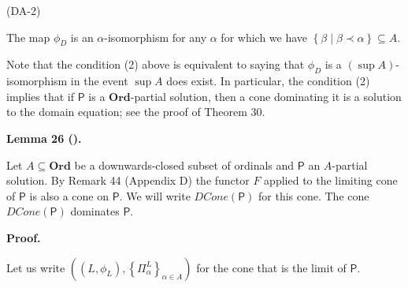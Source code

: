  
 
\par\noindent  (DA-2) 
 
The map $\phi_{D}$ is an $\alpha$-isomorphism for any $\alpha$ for which we have $\left\{\beta\middle|\beta\prec\alpha\right\}\subseteq A$.\par
 
 
  
 
 
 
Note that the condition (2) above is equivalent to saying that $\phi_{D}$ is a $(\sup{}A)$-isomorphism in the event $\sup{}A$ does exist. In particular, the condition (2) implies that if $\boldsymbol{\mathsf{P}}$ is a $\mathbf{Ord}$-partial solution, then a cone dominating it is a solution to the domain equation; see the proof of Theorem 30.\par
 
 
 
\par\medskip\noindent\textbf{Lemma 26 ().}\par
 
 
Let $A\subseteq\mathbf{Ord}$ be a downwards-closed subset of ordinals and $\boldsymbol{\mathsf{P}}$ an $A$-partial solution. By Remark 44 (Appendix D) the functor $F$ applied to the limiting cone of $\boldsymbol{\mathsf{P}}$ is also a cone on $\boldsymbol{\mathsf{P}}$. We will write $\mathit{DCone}(\boldsymbol{\mathsf{P}})$ for this cone. The cone $\mathit{DCone}(\boldsymbol{\mathsf{P}})$ dominates $\boldsymbol{\mathsf{P}}$.\par
 
 
 
 
\par\medskip\noindent\textbf{Proof.}\par
 
 
Let us write $((L,\phi_{L}),\left\{\Pi^{L}_{\alpha}\right\}_{\alpha\in A})$ for the cone that is the limit of $\boldsymbol{\mathsf{P}}$.\par
 
